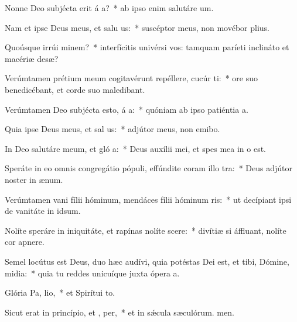 \item Nonne Deo subjécta erit á a?~* ab ipso enim salutáre um.
\item Nam et ipse Deus meus, et salu us:~* suscéptor meus, non movébor plius.
\item Quoúsque irrúi  minem?~* interfícitis univérsi vos: tamquam paríeti inclináto et macériæ desæ?
\item Verúmtamen prétium meum cogitavérunt repéllere, cucúr  ti:~* ore suo benedicébant, et corde suo maledibant.
\item Verúmtamen Deo subjécta esto, á a:~* quóniam ab ipso patiéntia a.
\item Quia ipse Deus meus, et sal us:~* adjútor meus, non emibo.
\item In Deo salutáre meum, et gló a:~* Deus auxílii mei, et spes mea in o est.
\item Speráte in eo omnis congregátio pópuli, effúndite coram illo  tra:~* Deus adjútor noster in ænum.
\item Verúmtamen vani fílii hóminum, mendáces fílii hóminum  ris:~* ut decípiant ipsi de vanitáte in idsum.
\item Nolíte speráre in iniquitáte, et rapínas nolíte scere:~* divítiæ si áffluant, nolíte cor apnere.
\item Semel locútus est Deus, duo hæc audívi, quia potéstas Dei est, et tibi, Dómine, midia:~* quia tu reddes unicuíque juxta ópera a.
\item Glória Pa,  lio,~* et Spirítui to.
\item Sicut erat in princípio, et ,  per,~* et in sǽcula sæculórum. men.
